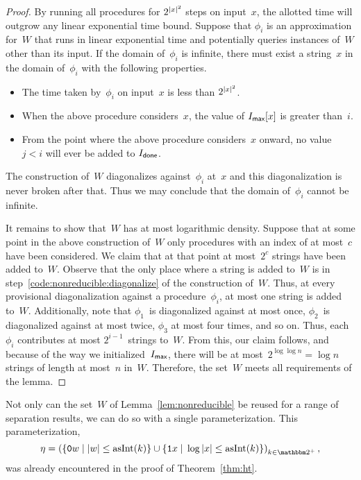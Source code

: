 \begin{proof}
  By running all procedures for $2^{{\lvert x\rvert}^2}$ steps on input~$x$, the allotted time will outgrow any linear exponential time bound.
  Suppose that $\phi_i$ is an approximation for~$W$ that runs in linear exponential time and potentially queries instances of~$W$ other than its input.
  If the domain of~$\phi_i$ is infinite, there must exist a string~$x$ in the domain of~$\phi_i$ with the following properties.
  \begin{itemize}
  \item
    The time taken by~$\phi_i$ on input~$x$ is less than $2^{{\lvert x\rvert}^2}$.
  \item
    When the above procedure considers~$x$, the value of $I_\textsf{max}[x]$ is greater than~$i$.
  \item
    From the point where the above procedure considers~$x$ onward, no value~$j < i$ will ever be added to $I_\textsf{done}$.
  \end{itemize}
  The construction of~$W$ diagonalizes against~$\phi_i$ at~$x$ and this diagonalization is never broken after that.
  Thus we may conclude that the domain of~$\phi_i$ cannot be infinite.

  It remains to show that~$W$ has at most logarithmic density.
  Suppose that at some point in the above construction of~$W$ only procedures with an index of at most~$c$ have been considered.
  We claim that at that point at most~$2^c$ strings have been added to~$W$.
  Observe that the only place where a string is added to~$W$ is in step~\ref{code:nonreducible:diagonalize} of the construction of~$W$.
  Thus, at every provisional diagonalization against a procedure~$\phi_i$, at most one string is added to~$W$.
  Additionally, note that $\phi_1$~is diagonalized against at most once, $\phi_2$~is diagonalized against at most twice, $\phi_3$ at most four times, and so on.
  Thus, each~$\phi_i$ contributes at most $2^{i - 1}$~strings to~$W$.
  From this, our claim follows, and because of the way we initialized~$I_\textsf{max}$, there will be at most~$2^{\log \log n} = \log n$ strings of length at most~$n$ in~$W$.
  Therefore, the set~$W$ meets all requirements of the lemma.
\end{proof}

Not only can the set~$W$ of Lemma~\ref{lem:nonreducible} be reused for a range of separation results, we can do so with a single parameterization.
This parameterization,
\begin{equation}
\label{eq:separation-parameterization}
  \eta \deq \left(\{\bits{0}w \st \length{w} \le \asNat(k)\} \cup \{\bits{1}x \st \log\length{x} \le \asNat(k)\}\right)_{k \in \binary^+},
\end{equation}
was already encountered in the proof of Theorem~\ref{thm:ht}.

